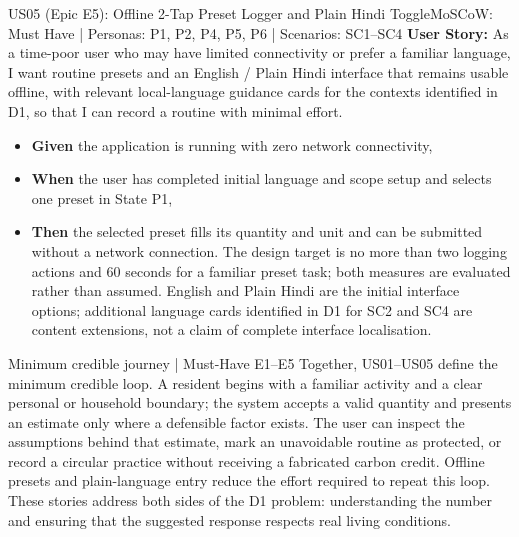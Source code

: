 \documentclass[12pt,a4paper]{article}
\begin{document}
\begin{storybox}{US05 (Epic E5): Offline 2-Tap Preset Logger and Plain Hindi Toggle}{MoSCoW: Must Have | Personas: P1, P2, P4, P5, P6 | Scenarios: SC1--SC4}
\textbf{User Story:} As a time-poor user who may have limited connectivity or prefer a familiar language, I want routine presets and an English / Plain Hindi interface that remains usable offline, with relevant local-language guidance cards for the contexts identified in D1, so that I can record a routine with minimal effort.
\begin{itemize}
    \item \textbf{Given} the application is running with zero network connectivity,
    \item \textbf{When} the user has completed initial language and scope setup and selects one preset in State P1,
    \item \textbf{Then} the selected preset fills its quantity and unit and can be submitted without a network connection. The design target is no more than two logging actions and 60 seconds for a familiar preset task; both measures are evaluated rather than assumed. English and Plain Hindi are the initial interface options; additional language cards identified in D1 for SC2 and SC4 are content extensions, not a claim of complete interface localisation.
\end{itemize}
\end{storybox}

\begin{insightbox}{Minimum credible journey | Must-Have E1--E5}
Together, US01--US05 define the minimum credible loop. A resident begins with a familiar activity and a clear personal or household boundary; the system accepts a valid quantity and presents an estimate only where a defensible factor exists. The user can inspect the assumptions behind that estimate, mark an unavoidable routine as protected, or record a circular practice without receiving a fabricated carbon credit. Offline presets and plain-language entry reduce the effort required to repeat this loop. These stories address both sides of the D1 problem: understanding the number and ensuring that the suggested response respects real living conditions.
\end{insightbox}
\end{document}
